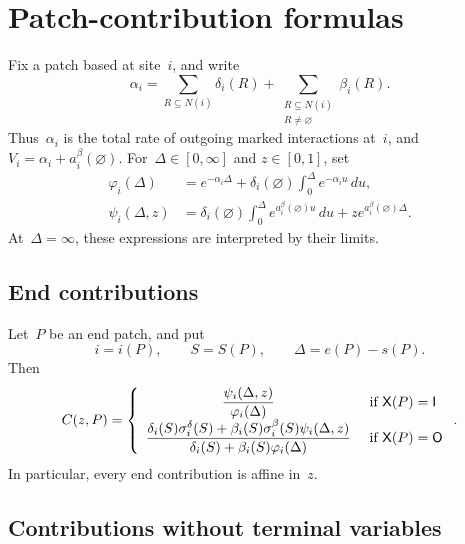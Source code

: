 \section{Patch-contribution formulas}
\label{app:contribution-formulas}

Fix a patch based at site~$i$, and write
\begin{equation*}
\alpha_i
=
\sum_{R\subseteq N(i)}\delta_i(R)
+
\sum_{\substack{R\subseteq N(i)\\R\neq\varnothing}}\beta_i(R).
\end{equation*}
Thus~$\alpha_i$ is the total rate of outgoing marked interactions at~$i$, and
$V_i=\alpha_i+a_i^\beta(\varnothing)$. For~$\Delta\in[0,\infty]$ and
$z\in[0,1]$, set
\begin{align}
\varphi_i(\Delta)
&=
e^{-\alpha_i\Delta}
+
\delta_i(\varnothing)
\int_0^\Delta e^{-\alpha_i u}\,du,
\label{eq:patch-phi}
\\
\psi_i(\Delta,z)
&=
\delta_i(\varnothing)
\int_0^\Delta e^{a_i^\beta(\varnothing)u}\,du
+
z e^{a_i^\beta(\varnothing)\Delta}.
\label{eq:patch-psi}
\end{align}
At~$\Delta=\infty$, these expressions are interpreted by their limits.

\subsection{End contributions}
\label{app:end-formulas}

Let~$P$ be an end patch, and put
\begin{equation*}
i=i(P),
\qquad
S=S(P),
\qquad
\Delta=e(P)-s(P).
\end{equation*}
Then
\begin{equation}
\label{eq:end-contribution-formulas}
C(z,P)
=
\left\{\begin{array}{cl} 
\displaystyle
\frac{\psi_i(\Delta,z)}{\varphi_i(\Delta)}
 &\text{ if } \mathsf X(P)=\mathsf I \\ 
\displaystyle
\frac{
\delta_i(S)\sigma_i^\delta(S)
+
\beta_i(S)\sigma_i^\beta(S)\psi_i(\Delta,z)
}{
\delta_i(S)+\beta_i(S)\varphi_i(\Delta)
}
 &\text{ if } \mathsf X(P)=\mathsf O \end{array}\right..
\end{equation}
In particular, every end contribution is affine in~$z$.

\subsection{Contributions without terminal variables}
\label{app:bulk-formulas}

